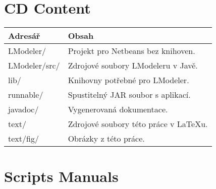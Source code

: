\chapter{CD Content}


\begin{table}[h]
	\centering
	\renewcommand{\arraystretch}{1.2}
	\begin{tabular}{|l|l|}
		\hline
		Adresář & Obsah  \\
		\hline
		\hline
		LModeler/ & Projekt pro Netbeans bez knihoven. \\
		LModeler/src/ & Zdrojové soubory LModeleru v Javě. \\
		lib/ & Knihovny potřebné pro LModeler. \\
		runnable/ & Spustitelný JAR soubor s aplikací.\\
		javadoc/ & Vygenerovaná dokumentace. \\
		text/ & Zdrojové soubory této práce v LaTeXu. \\
		text/fig/ & Obrázky z této práce. \\
		\hline
	\end{tabular}
	\label{tab:cdcontent}
\end{table}

\chapter{Scripts Manuals}



